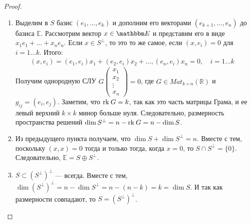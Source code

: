 \begin{proof}\
	\begin{enumerate}
	\item Выделим в $S$ базис $(e_1, \ldots, e_k)$ и дополним его векторами $(e_{k+1}, \ldots, e_n)$ до базиса $\mathbb{E}$. Рассмотрим вектор $x \in \E$ и представим его в виде $x_1e_1 + \ldots + x_ne_n$. Если $x \in S^\perp$, то это то же самое, если $(x, e_i) = 0$ для $i = 1 \ldots k$. Итого:
	\begin{gather*}
		(x,e_i) = (e_1, e_i)x_1 + (e_2, e_i) x_2 + \ldots, (e_n, e_i) x_n= 0, \quad i = 1 \ldots k		
	\end{gather*}
	Получим однородную СЛУ $G\begin{pmatrix}
	x_1\\x_2\\ \vdots\\ x_n
	\end{pmatrix} = 0$, где $G \in Mat_{k\times n}(\mathbb{R})$ и $g_{ij} = (e_i, e_j)$. Заметим, что $\mathrm{rk}\: G =  k$, так как это часть матрицы Грама, и ее левый верхний $k\times k$ минор больше нуля. Следовательно, размерность пространства решений $\dim S^\perp = n - \mathrm{rk}\: G = n - \dim S$.
	\item Из предыдущего пункта получаем, что $\dim S + \dim S^\perp = n$. Вместе с тем, поскольку $(x,x) = 0$ тогда и только тогда, когда $x = 0$, то $S \cap S^\perp = \{0\}$. Следовательно, $\mathbb{E} = S \oplus S^\perp$.
	\item $S \subset (S^\perp)^\perp$ --- всегда. Вместе с тем, $\dim (S^\perp)^\perp = n - \dim S^\perp = n - (n - k) =  k = \dim S$. И так как размерности совпадают, то $S = (S^\perp)^\perp$.
\end{enumerate}
\end{proof}

